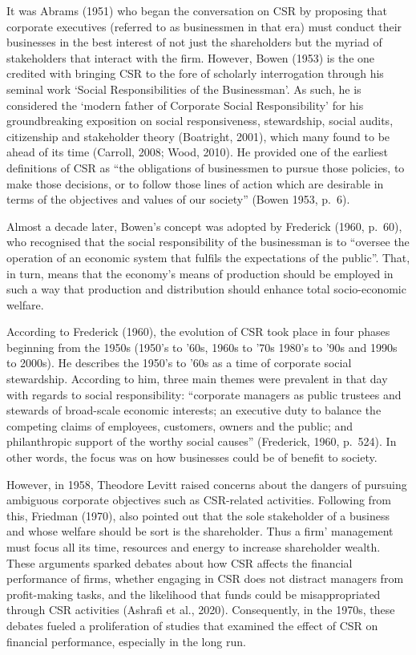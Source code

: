 \documentclass[
]{mitthesis}
\begin{document}
It was Abrams (1951) who began the conversation on CSR by proposing that corporate executives (referred to as businessmen in that era) must conduct their businesses in the best interest of not just the shareholders but the myriad of stakeholders that interact with the firm. However, Bowen (1953) is the one credited with bringing CSR to the fore of scholarly interrogation through his seminal work `Social Responsibilities of the Businessman'. As such, he is considered the `modern father of Corporate Social Responsibility' for his groundbreaking exposition on social responsiveness, stewardship, social audits, citizenship and stakeholder theory (Boatright, 2001), which many found to be ahead of its time (Carroll, 2008; Wood, 2010). He provided one of the earliest definitions of CSR as ``the obligations of businessmen to pursue those policies, to make those decisions, or to follow those lines of action which are desirable in terms of the objectives and values of our society'' (Bowen 1953, p.~6).

Almost a decade later, Bowen's concept was adopted by Frederick (1960, p.~60), who recognised that the social responsibility of the businessman is to ``oversee the operation of an economic system that fulfils the expectations of the public''. That, in turn, means that the economy's means of production should be employed in such a way that production and distribution should enhance total socio-economic welfare.

According to Frederick (1960), the evolution of CSR took place in four phases beginning from the 1950s (1950's to '60s, 1960s to '70s 1980's to '90s and 1990s to 2000s). He describes the 1950's to '60s as a time of corporate social stewardship. According to him, three main themes were prevalent in that day with regards to social responsibility: ``corporate managers as public trustees and stewards of broad-scale economic interests; an executive duty to balance the competing claims of employees, customers, owners and the public; and philanthropic support of the worthy social causes'' (Frederick, 1960, p.~524). In other words, the focus was on how businesses could be of benefit to society.

However, in 1958, Theodore Levitt raised concerns about the dangers of pursuing ambiguous corporate objectives such as CSR-related activities. Following from this, Friedman (1970), also pointed out that the sole stakeholder of a business and whose welfare should be sort is the shareholder. Thus a firm' management must focus all its time, resources and energy to increase shareholder wealth. These arguments sparked debates about how CSR affects the financial performance of firms, whether engaging in CSR does not distract managers from profit-making tasks, and the likelihood that funds could be misappropriated through CSR activities (Ashrafi et al., 2020). Consequently, in the 1970s, these debates fueled a proliferation of studies that examined the effect of CSR on financial performance, especially in the long run.
\end{document}
